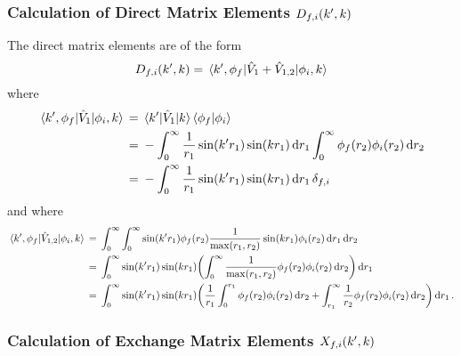 \documentclass{article}
\begin{document}
\subsubsection{Calculation of Direct Matrix Elements $D_{f, i}\lr{k', k}$}
\label{sec:calc-dir-me}

The direct matrix elements are of the form
\begin{equation*}
  D_{f, i}\lr{k', k}
  =
  \mel{k', \phi_{f}}{\hat{V}_{1} + \hat{V}_{1, 2}}{\phi_{i}, k}
\end{equation*}
where
\begin{alignat*}{2}
  \mel{k', \phi_{f}}{\hat{V}_{1}}{\phi_{i}, k}
  {}={}
  &
  \mel{k'}{\hat{V}_{1}}{k}
  \braket{\phi_{f}}{\phi_{i}}
  \\
  {}={}
  &
  -
  \int_{0}^{\infty}
  {
    \dfrac{1}{r_{1}}
    \sin\lr{k' r_{1}}
    \sin\lr{k r_{1}}
  }
  \dd{r_{1}}
  \int_{0}^{\infty}
  {
    \phi_{f}\lr{r_{2}}
    \phi_{i}\lr{r_{2}}
  }
  \dd{r_{2}}
  \\
  {}={}
  &
  -
  \int_{0}^{\infty}
  {
    \dfrac{1}{r_{1}}
    \sin\lr{k' r_{1}}
    \sin\lr{k r_{1}}
  }
  \dd{r_{1}}
  \delta_{f, i}
\end{alignat*}
and where
\begin{alignat*}{2}
  \mel{k', \phi_{f}}{\hat{V}_{1, 2}}{\phi_{i}, k}
  {}={}
  &
  \int_{0}^{\infty}
  \int_{0}^{\infty}
  {
    \sin\lr{k' r_{1}}
    \phi_{f}\lr{r_{2}}
    \dfrac{1}{\max\lr{r_{1}, r_{2}}}
    \sin\lr{k r_{1}}
    \phi_{i}\lr{r_{2}}
  }
  \dd{r_{1}}
  \dd{r_{2}}
  \\
  {}={}
  &
  \int_{0}^{\infty}
  {
    \sin\lr{k' r_{1}}
    \sin\lr{k r_{1}}
    \lr[\bigg]
    {
      \int_{0}^{\infty}
      {
        \dfrac{1}{\max\lr{r_{1}, r_{2}}}
        \phi_{f}\lr{r_{2}}
        \phi_{i}\lr{r_{2}}
      }
      \dd{r_{2}}
    }
  }
  \dd{r_{1}}
  \\
  {}={}
  &
  \int_{0}^{\infty}
  {
    \sin\lr{k' r_{1}}
    \sin\lr{k r_{1}}
    \lr[\bigg]
    {
      \dfrac{1}{r_{1}}
      \int_{0}^{r_{1}}
      {
        \phi_{f}\lr{r_{2}}
        \phi_{i}\lr{r_{2}}
      }
      \dd{r_{2}}
      +
      \int_{r_{1}}^{\infty}
      {
        \dfrac{1}{r_{2}}
        \phi_{f}\lr{r_{2}}
        \phi_{i}\lr{r_{2}}
      }
      \dd{r_{2}}
    }
  }
  \dd{r_{1}}
  .
\end{alignat*}

\subsubsection{Calculation of Exchange Matrix Elements $X_{f, i}\lr{k', k}$}
\label{sec:calc-exc-me}
\end{document}
